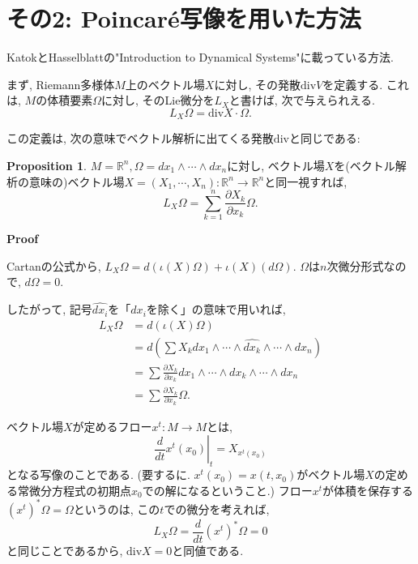\documentclass[a4paper]{ujarticle}
\makeatletter
\newcommand{\Div}{\mathrm{div}}
\numberwithin{equation}{section}
\theoremstyle{definition}
\newtheorem{proposition}{Proposition}
\renewenvironment{proof}[1][Proof]{\par
  \pushQED{\qed}%
  \normalfont \topsep6\p@\@plus6\p@\relax
  \trivlist
  \item\relax
  {\bfseries
  #1\@addpunct{.}}\hspace\labelsep\ignorespaces
}{%
  \popQED\endtrivlist\@endpefalse
}
\makeatother
\begin{document}
    \section{その2: Poincar\'{e}写像を用いた方法}
    KatokとHasselblattの"Introduction to Dynamical Systems"に載っている方法.

    \vspace{\baselineskip}

    まず, Riemann多様体$M$上のベクトル場$X$に対し, その発散$\Div{V}$を定義する.
    これは, $M$の体積要素$\Omega$に対し, そのLie微分を$L_{X}$と書けば, 次で与えられえる.
    \[
        L_{X} \Omega = \Div{X} \cdot \Omega.
    \]
    
    この定義は, 次の意味でベクトル解析に出てくる発散$\Div$と同じである:

    \begin{proposition}
        $M = \mathbb{R}^n, \Omega = d x_1 \wedge \cdots \wedge d x_n$に対し, 
        ベクトル場$X$を(ベクトル解析の意味の)ベクトル場$X = (X_1, \cdots, X_n): \mathbb{R}^n \rightarrow \mathbb{R}^n$と同一視すれば, 
        \[
            L_{X} \Omega =  \sum_{k = 1}^{n} \frac{\partial X_k}{\partial x_k} \Omega.
        \]
    \end{proposition}

    \begin{proof}
        Cartanの公式から, 
        $L_{X} \Omega = d (\iota(X) \Omega) + \iota(X) (d \Omega)$.
        $\Omega$は$n$次微分形式なので, $d \Omega = 0$.

        したがって, 記号$\hat{d x_i}$を「$d x_i$を除く」の意味で用いれば, 
        \begin{align}
            L_{X} \Omega &= d (\iota(X) \Omega) \\
            &= d (\sum X _ k d x_1 \wedge \cdots \wedge \hat{d x_k} \wedge \cdots \wedge d x_n)\\
            &= \sum \frac{\partial X_k}{\partial x_k} d x_1 \wedge \cdots \wedge d x_k \wedge \cdots \wedge d x_n \\
            &= \sum \frac{\partial X_k}{\partial x_k} \Omega.
        \end{align}
    \end{proof}

    ベクトル場$X$が定めるフロー$x^{t}: M \rightarrow M$とは, 
    \[
        \left. \frac{d}{d t} x^{t}(x_0) \right|_{t} = X_{x^{t}(x_0)}
    \]
    となる写像のことである. 
    (要するに. $x^{t}(x_0) = x(t, x_0)$がベクトル場$X$の定める常微分方程式の初期点$x_0$での解になるということ.)
    フロー$x^{t}$が体積を保存する$(x^{t})^{*} \Omega = \Omega$というのは, 
    この$t$での微分を考えれば, 
    \[
        L_{X} \Omega = \frac{d}{d t} (x^{t})^{*} \Omega = 0
    \]
    と同じことであるから, $\Div X = 0$と同値である.
\end{document}
